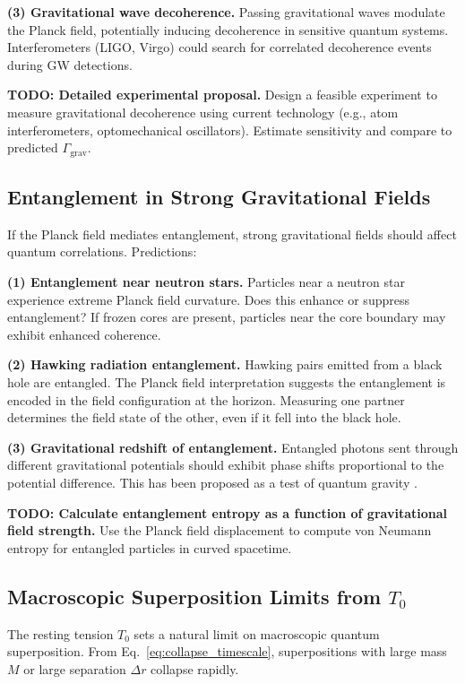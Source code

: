 \documentclass[11pt,a4paper]{article}
\newcommand{\Tzero}{\ensuremath{T_0}}
\theoremstyle{definition}
\theoremstyle{remark}
\begin{document}
\textbf{(3) Gravitational wave decoherence.} Passing gravitational waves modulate the Planck field, potentially inducing decoherence in sensitive quantum systems. Interferometers (LIGO, Virgo) could search for correlated decoherence events during GW detections.

\textbf{TODO: Detailed experimental proposal.} Design a feasible experiment to measure gravitational decoherence using current technology (e.g., atom interferometers, optomechanical oscillators). Estimate sensitivity and compare to predicted $\Gamma_{\mathrm{grav}}$.

\subsection{Entanglement in Strong Gravitational Fields}
\label{sec:entanglement_strong_grav}

If the Planck field mediates entanglement, strong gravitational fields should affect quantum correlations. Predictions:

\textbf{(1) Entanglement near neutron stars.} Particles near a neutron star experience extreme Planck field curvature. Does this enhance or suppress entanglement? If frozen cores are present, particles near the core boundary may exhibit enhanced coherence.

\textbf{(2) Hawking radiation entanglement.} Hawking pairs emitted from a black hole are entangled. The Planck field interpretation suggests the entanglement is encoded in the field configuration at the horizon. Measuring one partner determines the field state of the other, even if it fell into the black hole.

\textbf{(3) Gravitational redshift of entanglement.} Entangled photons sent through different gravitational potentials should exhibit phase shifts proportional to the potential difference. This has been proposed as a test of quantum gravity \cite{Zych2011}.

\textbf{TODO: Calculate entanglement entropy as a function of gravitational field strength.} Use the Planck field displacement to compute von Neumann entropy for entangled particles in curved spacetime.

\subsection{Macroscopic Superposition Limits from $\Tzero$}
\label{sec:macroscopic_superposition_limits}

The resting tension $\Tzero$ sets a natural limit on macroscopic quantum superposition. From Eq.~\eqref{eq:collapse_timescale}, superpositions with large mass $M$ or large separation $\Delta r$ collapse rapidly.
\end{document}
